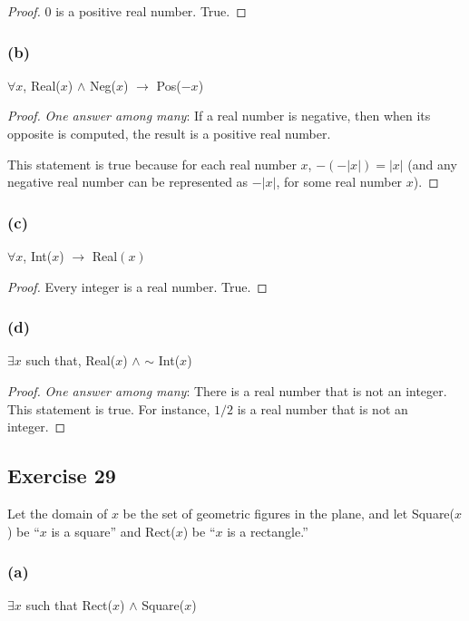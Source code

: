 \documentclass[14pt]{extarticle}
\newcommand{\fa}{\forall}
\newcommand{\te}{\exists}
\begin{document}
\begin{proof}
    0 is a positive real number. True.
\end{proof}

\subsubsection{(b)}
$\fa x$, Real($x$) $\wedge$ Neg($x$) $\to$ Pos($-x$)

\begin{proof}
    {\it One answer among many}: If a real number is negative, then when its opposite is computed, the result is a positive real number.

    This statement is true because for each real number $x$, $-(-|x|) = |x|$ (and any negative real number can be represented as $-|x|$, for some real number $x$).
\end{proof}

\subsubsection{(c)}
$\fa x$, Int($x$) $\to$ Real$(x)$

\begin{proof}
    Every integer is a real number. True.
\end{proof}

\subsubsection{(d)}
$\te x$ such that, Real($x$) $\wedge$ $\sim$ Int($x$)

\begin{proof}
    {\it One answer among many}: There is a real number that is not an integer. This statement is true. For instance, $1/2$ is a real number that is not an integer.
\end{proof}

\subsection{Exercise 29}
Let the domain of $x$ be the set of geometric figures in the plane, and let Square($x$) be “$x$ is a square” and Rect($x$) be “$x$ is a rectangle.”

\subsubsection{(a)}
$\te x$ such that Rect($x$) $\wedge$ Square($x$)
\end{document}
